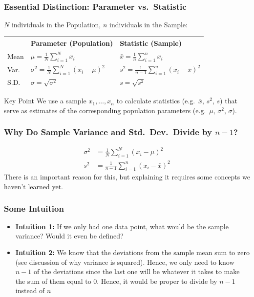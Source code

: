 \documentclass[handout]{beamer}
\begin{document}
\begin{frame}
\frametitle{Essential Distinction: Parameter vs.\ Statistic}
	$N$ individuals in the Population, $n$ individuals in the Sample:
	\bigskip
	\begin{tabular}{l|l|l}
		&\textbf{Parameter} (Population)&\textbf{Statistic} (Sample)\\
		\hline
		Mean & $\displaystyle \mu = \frac{1}{N} \sum_{i = 1}^N x_i$	& $\displaystyle \bar{x} = 				\frac{1}{n} \sum_{i = 1}^n x_i$ 
		\\
		Var.\ &$ \displaystyle \sigma^2 = \frac{1}{N}\sum_{i = 1}^N (x_i - \mu)^2$ &$ \displaystyle 			s^2 = \frac{1}{n - 1}\sum_{i = 1}^n(x_i - \bar{x})^2$
		\\
		S.D.\ & $ \displaystyle \sigma = \sqrt{\sigma^2}$ &$ \displaystyle s = \sqrt{s^2}$ 
	\end{tabular}
	\bigskip	
	\begin{alertblock}{Key Point}
		We  use a \alert{sample} $x_1, \hdots, x_n$ to calculate \alert{statistics} (e.g.\ $\bar{x}$, 				$s^2$, $s$) that serve as \alert{estimates} of the corresponding population 							\alert{parameters} (e.g.\ $\mu$, $\sigma^2$, $\sigma$).
	\end{alertblock}
\end{frame}

\begin{frame}
\frametitle{Why Do Sample Variance and Std.\ Dev.\ Divide by $n - 1$? }
	\begin{align*}
		\sigma^2 &= \frac{1}{N}\sum_{i = 1}^N (x_i - \mu)^2
		\\
		s^2 &= \frac{1}{n - 1}\sum_{i = 1}^n(x_i - \bar{x})^2
	\end{align*}
	\alert{There is an important reason for this, but explaining it requires some concepts we 				haven't learned yet. }
\end{frame}

\begin{frame}
\frametitle{Some Intuition}
	\begin{itemize}
		\item \textbf{Intuition 1:} If we only had one data point, what would be the sample 					variance? Would it even be defined?
		\item \textbf{Intuition 2:} We know that the deviations from the sample mean sum to zero 			(see discussion of why variance is squared). Hence, we only need to know $n - 1$ of the 				deviations since the last one will be whatever it takes to make the sum of them equal to 0. 			Hence, it would be proper to divide by $n - 1$ instead of $n$
	\end{itemize}
\end{frame}
\end{document}
